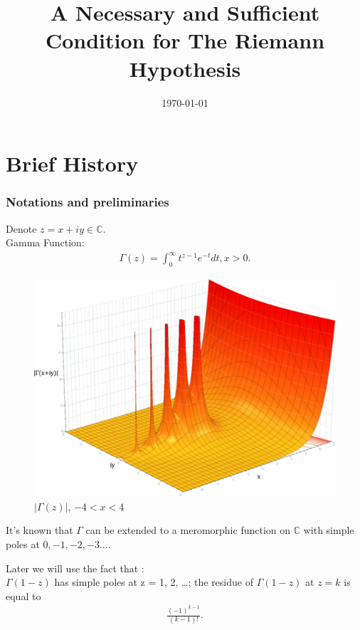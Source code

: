 \documentclass{beamer}
\title{A Necessary and Sufficient Condition for The Riemann Hypothesis}
\date{\today}
\newcommand{\C}{\mathbb C }
\begin{document}
\frame{\titlepage}


\section{Brief History}

\frame
{
\frametitle{Notations and preliminaries}

Denote $z = x + iy \in \C$.\\

Gamma Function:
\begin{align*}
\Gamma(z) = \int^{\infty}_{0} t^{z-1}e^{-t} dt, x > 0.
\end{align*}

\begin{figure} 
\centering 
\includegraphics[scale=0.25]{pics/GammaAbs.pdf}
\caption{$|\Gamma(z)|$, $-4 < x < 4$} 
\label{fig1} 
\end{figure} 


}

\frame
{
It's known that $\Gamma$ can be extended to a meromorphic function on $\C$ with
simple poles at $0, -1, -2, -3\ldots$.

Later we will use the fact that :\\
$\Gamma(1-z)$ has simple poles at z = 1, 2, \ldots ; the residue of $\Gamma(1-z)$ at $z = k$ is
equal to
\begin{align*}
\frac{(-1)^{k-1}}{(k-1)!}.
\end{align*}
}

\end{document}
